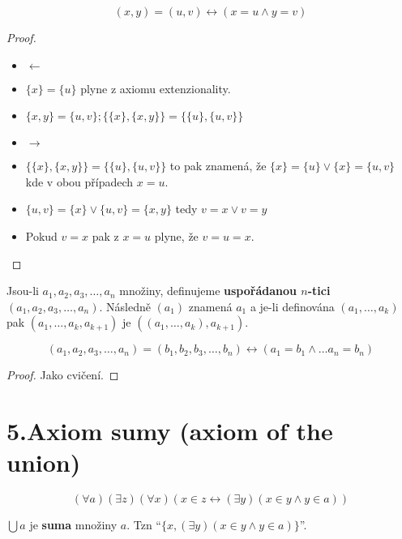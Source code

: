 \begin{lemma}
	$$
	(x,y) = (u,v) \leftrightarrow (x = u \land y = v)
	$$
\end{lemma}

\begin{proof}
	\begin{itemize}
		\item $\leftarrow$
		\item $\{x\} = \{u\}$ plyne z axiomu extenzionality.
		\item $\{x,y\} = \{u,v\}; \{\{x\},\{x,y\}\} = \{\{u\},\{u,v\}\}$
		\item $\rightarrow$
		\item $\{\{x\},\{x,y\}\} = \{\{u\},\{u,v\}\}$ to pak znamená, že $\{x\} = \{u\} \lor \{x\} = \{u,v\}$ kde v obou případech $x=u$.
		\item $\{u,v\} = \{x\} \lor \{u,v\} = \{x,y\}$ tedy $v = x \lor v = y$
		\item Pokud $v=x$ pak z $x = u$ plyne, že $v=u=x$.
	\end{itemize}
\end{proof}

\begin{definice}
	Jsou-li $a_{1},a_{2},a_{3}, \dots ,a_{n}$ množiny, definujeme \textbf{uspořádanou $n$-tici} \newline $(a_{1},a_{2},a_{3}, \dots ,a_{n})$. Následně $(a_{1})$ znamená $a_{1}$ a je-li definována $(a_{1}, \dots ,a_{k})$ pak \newline $(a_{1}, \dots ,a_{k}, a_{k+1})$ je $((a_{1}, \dots ,a_{k}), a_{k+1})$.
\end{definice}

\begin{lemma}
	$$
	(a_{1},a_{2},a_{3}, \dots ,a_{n}) = (b_{1},b_{2},b_{3}, \dots ,b_{n}) \leftrightarrow (a_{1} = b_{1} \land \dots a_{n} = b_{n})
	$$
\end{lemma}

\begin{proof}
	Jako cvičení.
\end{proof}

\section{5.Axiom sumy (axiom of the union)}

$$
(\forall a)(\exists z)(\forall x)(x \in z \leftrightarrow (\exists y)(x \in y \land y \in a))
$$

\begin{definice}
	$\bigcup a$ je \textbf{suma} množiny $a$. Tzn “$\{x, (\exists y)(x \in y \land y \in a)\}$”.
\end{definice}

